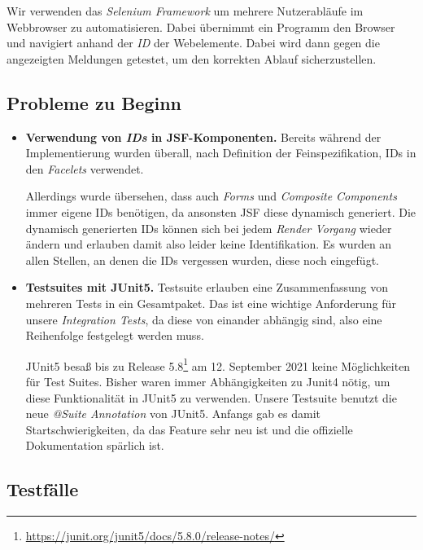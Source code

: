 
Wir verwenden das \emph{Selenium Framework} um mehrere Nutzerabläufe im Webbrowser zu automatisieren.
Dabei übernimmt ein Programm den Browser und navigiert anhand der \emph{ID}
der Webelemente. Dabei wird dann gegen die angezeigten Meldungen getestet, um
den korrekten Ablauf sicherzustellen.

\subsection{Probleme zu Beginn}

\begin{itemize}
	\item \textbf{Verwendung von \emph{IDs} in JSF-Komponenten.} Bereits während der
	Implementierung wurden überall, nach Definition der Feinspezifikation, IDs in den \emph{Facelets} verwendet.

	Allerdings wurde übersehen, dass auch \emph{Forms} und \emph{Composite Components} immer eigene IDs benötigen, da ansonsten JSF diese dynamisch
	generiert. Die dynamisch generierten IDs können sich bei jedem \emph{Render Vorgang} wieder ändern und erlauben damit also leider keine Identifikation.\newline
	Es wurden an allen Stellen, an denen die IDs vergessen wurden, diese noch eingefügt.

	\item \textbf{Testsuites mit JUnit5.} Testsuite erlauben eine Zusammenfassung von mehreren Tests in ein Gesamtpaket. Das ist eine wichtige
	Anforderung für unsere \emph{Integration Tests}, da diese von einander abhängig sind, also eine Reihenfolge festgelegt werden muss.

	JUnit5 besaß bis zu Release 5.8\footnote{\url{https://junit.org/junit5/docs/5.8.0/release-notes/}}
	am 12. September 2021 keine Möglichkeiten für Test Suites. Bisher waren immer Abhängigkeiten zu Junit4 nötig, um diese
	Funktionalität in JUnit5 zu verwenden. Unsere Testsuite benutzt die neue
	\emph{@Suite Annotation} von JUnit5. Anfangs gab es damit Startschwierigkeiten, da das Feature sehr neu ist und die offizielle
	Dokumentation spärlich ist.
\end{itemize}

\subsection{Testfälle}

